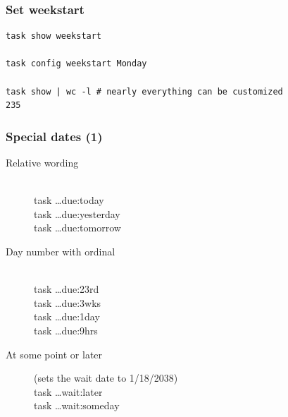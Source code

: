 \documentclass[t,handout]{beamer}
\begin{document}
\begin{frame}[fragile]\frametitle{Set weekstart}
    \vfill
    \begin{lstlisting}
task show weekstart

task config weekstart Monday

task show | wc -l # nearly everything can be customized
235\end{lstlisting}
\end{frame}

\begin{frame}[fragile]\frametitle{Special dates (1)}
    \begin{description}
    \item[Relative wording] \hfill \\
        task \ldots due:today \\
        task \ldots due:yesterday \\
        task \ldots due:tomorrow \\
    \item[Day number with ordinal] \hfill \\
        task \ldots due:23rd \\
        task \ldots due:3wks \\
        task \ldots due:1day \\
        task \ldots due:9hrs \\
    \item[At some point or later] (sets the wait date to 1/18/2038) \hfill \\
        task \ldots wait:later \\
        task \ldots wait:someday
    \end{description}
\end{frame}
\end{document}
